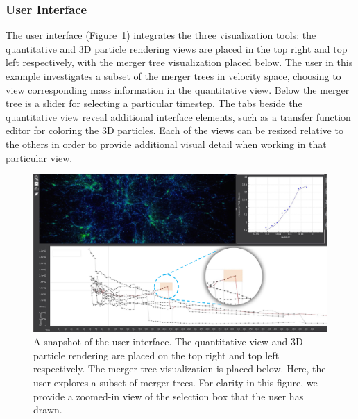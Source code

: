 \subsubsection{User Interface}
The user interface (Figure~\ref{fig:ui}) integrates the three visualization tools: the quantitative and 3D particle rendering views are placed in the top right and top left respectively, with the merger tree visualization placed below. The user in this example investigates a subset of the merger trees in velocity space, choosing to view corresponding mass information in the quantitative view. Below the merger tree is a slider for selecting a particular timestep. The tabs beside the quantitative view reveal additional interface elements, such as a transfer function editor for coloring the 3D particles. Each of the views can be resized relative to the others in order to provide additional visual detail when working in that particular view.

	\begin{figure}[t]
		\includegraphics[width=\textwidth]{images/darkmatter/ui_new_zoomin.png}
		\caption{A snapshot of the user interface. The quantitative view and 3D particle rendering are placed on the top right and top left respectively. The merger tree visualization is placed below. Here, the user explores a subset of merger trees. For clarity in this figure, we provide a zoomed-in view of the selection box that the user has drawn.}
		\label{fig:ui}
	\end{figure}

